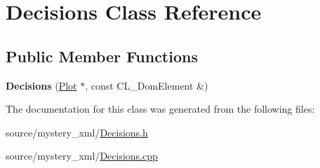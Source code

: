 \hypertarget{classDecisions}{
\section{Decisions Class Reference}
\label{classDecisions}
}
\subsection*{Public Member Functions}
\begin{DoxyCompactItemize}
\item 
\hypertarget{classDecisions_a8c89d9f293fd2a70a4c1509a60986382}{
{\bfseries Decisions} (\hyperlink{classPlot}{Plot} $\ast$, const CL\_\-DomElement \&)}
\label{classDecisions_a8c89d9f293fd2a70a4c1509a60986382}

\end{DoxyCompactItemize}


The documentation for this class was generated from the following files:\begin{DoxyCompactItemize}
\item 
source/mystery\_\-xml/\hyperlink{Decisions_8h}{Decisions.h}\item 
source/mystery\_\-xml/\hyperlink{Decisions_8cpp}{Decisions.cpp}\end{DoxyCompactItemize}
